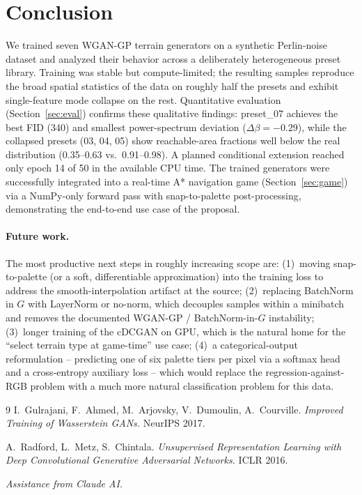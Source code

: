 \documentclass[11pt]{article}
\begin{document}
\section{Conclusion}
We trained seven WGAN-GP terrain generators on a synthetic Perlin-noise
dataset and analyzed their behavior across a deliberately heterogeneous
preset library. Training was stable but compute-limited; the resulting
samples reproduce the broad spatial statistics of the data on roughly half
the presets and exhibit single-feature mode collapse on the rest.
Quantitative evaluation (Section~\ref{sec:eval}) confirms these qualitative
findings: preset\_07 achieves the best FID (340) and smallest
power-spectrum deviation ($\Delta\beta = -0.29$), while the collapsed
presets (03, 04, 05) show reachable-area fractions well below the real
distribution (0.35--0.63 vs.\ 0.91--0.98). A planned conditional extension
reached only epoch 14 of 50 in the available CPU time. The trained generators
were successfully integrated into a real-time A* navigation game
(Section~\ref{sec:game}) via a NumPy-only forward pass with snap-to-palette
post-processing, demonstrating the end-to-end use case of the proposal.

\paragraph{Future work.}
The most productive next steps in roughly increasing scope are:
(1)~moving snap-to-palette (or a soft, differentiable approximation) into
the training loss to address the smooth-interpolation artifact at the source;
(2)~replacing BatchNorm in $G$ with LayerNorm or no-norm, which decouples
samples within a minibatch and removes the documented WGAN-GP /
BatchNorm-in-$G$ instability;
(3)~longer training of the cDCGAN on GPU, which is the natural home for the
``select terrain type at game-time'' use case;
(4)~a categorical-output reformulation -- predicting one of six palette
tiers per pixel via a softmax head and a cross-entropy auxiliary loss --
which would replace the regression-against-RGB problem with a much more
natural classification problem for this data.


\begin{thebibliography}{9}
I.~Gulrajani, F.~Ahmed, M.~Arjovsky, V.~Dumoulin, A.~Courville.
\textit{Improved Training of Wasserstein GANs.}
NeurIPS 2017.

A.~Radford, L.~Metz, S.~Chintala.
\textit{Unsupervised Representation Learning with Deep Convolutional
Generative Adversarial Networks.}
ICLR 2016.
\end{thebibliography}

\vspace{1em}
\noindent\small\textit{Assistance from Claude AI.}
\end{document}
